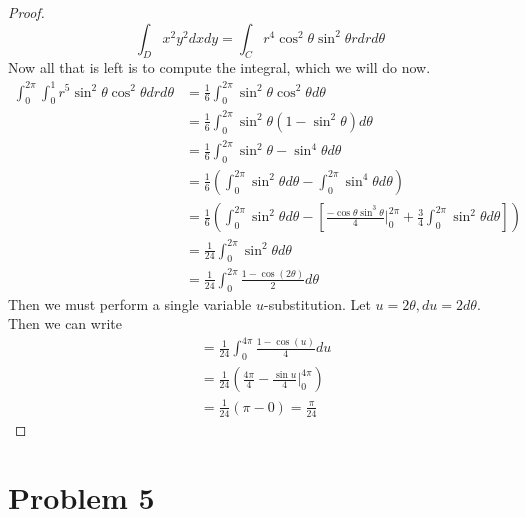 \documentclass{article}
\theoremstyle{definition}
\begin{document}
\begin{proof}
\[  \int_D x^2y^2 dxdy = \int_C r^4\cos^2\theta\sin^2\theta rdrd\theta  
\]
Now all that is left is to compute the integral, which we will do now.
\begin{align*}
    \int_0^{2\pi}\int_0^1 r^5 \sin^2\theta\cos^2\theta drd\theta &= \frac{1}{6}\int_0^{2\pi}\sin^2\theta\cos^2\theta d\theta\\
    &= \frac{1}{6}\int_0^{2\pi}\sin^2\theta(1-\sin^2\theta)d\theta\\
    &=\frac{1}{6}\int_0^{2\pi}\sin^2\theta-\sin^4\theta d\theta\\
    &=\frac{1}{6}\left(\int_0^{2\pi}\sin^2\theta d\theta-\int_0^{2\pi}\sin^4\theta d\theta\right)\\
    &=\frac{1}{6}\left(\int_0^{2\pi}\sin^2\theta d\theta-\left[\frac{-\cos\theta\sin^3\theta}{4}\bigg|_0^{2\pi} + \frac{3}{4}\int_0^{2\pi}\sin^2 \theta d \theta \right]\right)\\
    &=\frac{1}{24}\int_0^{2\pi}\sin^2\theta d\theta \\
    &= \frac{1}{24}\int_0^{2\pi}\frac{1-\cos(2\theta)}{2}d\theta
\end{align*}
Then we must perform a single variable $u$-substitution. Let $u = 2\theta, du = 2d\theta$. Then we can write
\begin{align*}
    &= \frac{1}{24}\int_0^{4\pi}\frac{1-\cos(u)}{4}du \\
    &= \frac{1}{24}\left(\frac{4\pi}{4} - \frac{\sin u}{4}\bigg|_0^{4\pi}\right)\\
    &= \frac{1}{24}\left(\pi - 0\right) = \frac{\pi}{24}
\end{align*}
\end{proof}
\section*{Problem 5}
\end{document}

